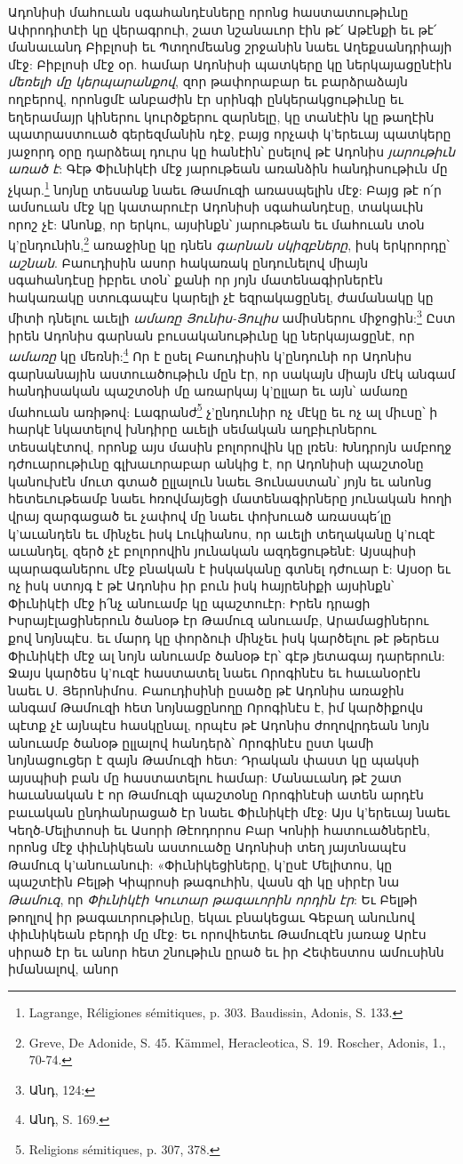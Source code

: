 \documentclass{article}
\begin{document}
{Ադոնիսի մահուան սգահանդէսները որոնց հաստատութիւնը Ափրոդիտէի կը վերագրուի, շատ նշանաւոր էին թէ՛ Աթէնքի եւ թէ՛ մանաւանդ Բիբլոսի եւ Պտղոմեանց շրջանին նաեւ Աղեքսանդրիայի մէջ: Բիբլոսի մէջ օր. համար Ադոնիսի պատկերը կը ներկայացընէին \emph{մեռելի մը կերպարանքով}, զոր թափորաբար եւ բարձրաձայն ողբերով, որոնցմէ անբաժին էր սրինգի ընկերակցութիւնը եւ եղերամայր կիներու կուրծքերու զարնելը, կը տանէին կը թաղէին պատրաստուած գերեզմանին դէջ, բայց որչափ կ'երեւայ պատկերը յաջորդ օրը դարձեալ դուրս կը հանէին՝ ըսելով թէ Ադոնիս \emph{յարութիւն առած է}: Գէթ Փիւնիկէի մէջ յարութեան առանձին հանդիսութիւն մը չկար.\footnote{Lagrange, Réligiones sémitiques, p. 303. Baudissin, Adonis, S. 133.} նոյնը տեսանք նաեւ Թամուզի առասպելին մէջ: Բայց թէ ո՛ր ամսուան մէջ կը կատարուէր Ադոնիսի սգահանդէսը, տակաւին որոշ չէ: Անոնք, որ երկու, այսինքն՝ յարութեան եւ մահուան տօն կ'ընդունին,\footnote{Greve, De Adonide, S. 45. Kämmel, Heracleotica, S. 19. Roscher, Adonis, 1., 70-74.} առաջինը կը դնեն \emph{գարնան սկիզբները}, իսկ երկրորդը՝ \emph{աշնան}. Բաուդիսին ասոր հակառակ ընդունելով միայն սգահանդէսը իբրեւ տօն՝ քանի որ յոյն մատենագիրներէն հակառակը ստուգապէս կարելի չէ եզրակացընել, ժամանակը կը միտի դնելու աւելի \emph{ամառը Յունիս-Յուլիս} ամիսներու միջոցին:\footnote{Անդ, 124:} Ըստ իրեն Ադոնիս գարնան բուսականութիւնը կը ներկայացընէ, որ \emph{ամառը} կը մեռնի:\footnote{Անդ, S. 169.} Որ է ըսել Բաուդիսին կ'ընդունի որ Ադոնիս գարնանային աստուածութիւն մըն էր, որ սակայն միայն մէկ անգամ հանդիսական պաշտօնի մը առարկայ կ'ըլլար եւ այն՝ ամառը մահուան առիթով: Լագրանժ\footnote{Religions sémitiques, p. 307, 378.} չ'ընդունիր ոչ մէկը եւ ոչ ալ միւսը՝ ի հարկէ նկատելով խնդիրը աւելի սեմական աղբիւրներու տեսակէտով, որոնք այս մասին բոլորովին կը լռեն: Խնդրոյն ամբողջ դժուարութիւնը գլխաւորաբար անկից է, որ Ադոնիսի պաշտօնը կանուխէն մուտ գտած ըլլալուն նաեւ Յունաստան՝ յոյն եւ անոնց հետեւութեամբ նաեւ հռովմայեցի մատենագիրները յունական հողի վրայ զարգացած եւ չափով մը նաեւ փոխուած առասպե՛լը կ'աւանդեն եւ մինչեւ իսկ Լուկիանոս, որ աւելի տեղականը կ'ուզէ աւանդել, զերծ չէ բոլորովին յունական ազդեցութենէ: Այսպիսի պարագաներու մէջ բնական է իսկականը գտնել դժուար է: Այսօր եւ ոչ իսկ ստոյգ է թէ Ադոնիս իր բուն իսկ հայրենիքի այսինքն՝ Փիւնիկէի մէջ ի՛նչ անուամբ կը պաշտուէր: Իրեն դրացի Իսրայէլացիներուն ծանօթ էր Թամուզ անուամբ, Արամացիներու քով նոյնպէս. եւ մարդ կը փորձուի մինչեւ իսկ կարծելու թէ թերեւս Փիւնիկէի մէջ ալ նոյն անուամբ ծանօթ էր՝ գէթ յետագայ դարերուն: Ջայս կարծես կ'ուզէ հաստատել նաեւ Որոգինէս եւ հաւանօրէն նաեւ Ս. Յերոնիմոս. Բաուդիսինի ըսածը թէ Ադոնիս առաջին անգամ Թամուզի հետ նոյնացընողը Որոգինէս է, իմ կարծիքովս պէտք չէ այնպէս հասկընալ, որպէս թէ Ադոնիս ժողովրդեան նոյն անուամբ ծանօթ ըլլալով հանդերձ՝ Որոգինէս ըստ կամի նոյնացուցեր է զայն Թամուզի հետ: Դրական փաստ կը պակսի այսպիսի բան մը հաստատելու համար: Մանաւանդ թէ շատ հաւանական է որ Թամուզի պաշտօնը Որոգինէսի ատեն արդէն բաւական ընդհանրացած էր նաեւ Փիւնիկէի մէջ: Այս կ'երեւայ նաեւ Կեղծ-Մելիտոսի եւ Ասորի Թէոդորոս Բար Կոնիի հատուածներէն, որոնց մէջ փիւնիկեան աստուածը Ադոնիսի տեղ յայտնապէս Թամուզ կ'անուանուի: «Փիւնիկեցիները, կ'ըսէ Մելիտոս, կը պաշտէին Բելթի Կիպրոսի թագուհին, վասն զի կը սիրէր նա \emph{Թամուզ}, որ \emph{Փիւնիկէի Կուտար թագաւորին որդին էր}: Եւ Բելթի թողլով իր թագաւորութիւնը, եկաւ բնակեցաւ Գեբաղ անունով փիւնիկեան բերդի մը մէջ: Եւ որովհետեւ Թամուզէն յառաջ Արէս սիրած էր եւ անոր հետ շնութիւն ըրած եւ իր Հեփեստոս ամուսինն իմանալով, անոր }
\end{document}
